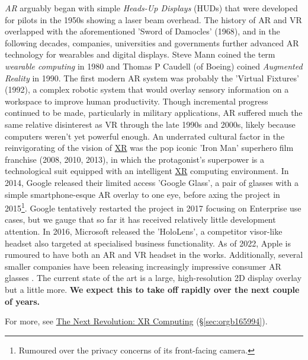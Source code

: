 \documentclass[logo,bsc,singlespacing,parskip]{infthesis}
\begin{document}
\emph{AR} arguably began with simple \emph{Heads-Up Displays} (HUDs) that were developed for pilots in the 1950s showing a laser beam overhead.
The history of AR and VR overlapped with the aforementioned 'Sword of Damocles' (1968), and in the following decades, companies, universities and governments further advanced AR technology for wearables and digital displays.
Steve Mann coined the term \emph{wearable computing} in 1980 and Thomas P Caudell (of Boeing) coined \emph{Augmented Reality} in 1990.
The first modern AR system was probably the 'Virtual Fixtures' (1992), a complex robotic system that would overlay sensory information on a workspace to improve human productivity.
Though incremental progress continued to be made, particularly in military applications, AR suffered much the same relative disinterest as VR through the late 1990s and 2000s, likely because computers weren't yet powerful enough.
An underrated cultural factor in the reinvigorating of the vision of \hyperref[org39cbd51]{XR} was the pop iconic 'Iron Man' superhero film franchise (2008, 2010, 2013),  in which the protagonist's superpower is a technological suit equipped with an intelligent \hyperref[org39cbd51]{XR} computing environment.
In 2014, Google released their limited access 'Google Glass', a pair of glasses with a simple smartphone-esque AR overlay to one eye, before axing the project in 2015\footnote{Rumoured over the privacy concerns of its front-facing camera.}.
Google tentatively restarted the project in 2017 focusing on Enterprise use cases, but we gauge that so far it has received relatively little development attention.
In 2016, Microsoft released the 'HoloLens', a competitor visor-like headset also targeted at specialised business functionality.
As of 2022, Apple is rumoured to have both an AR and VR headset in the works.
Additionally, several smaller companies have been releasing increasingly impressive consumer AR glasses \autocites{NrealAir}[][]{INMOAIRWorld}[][]{VuzixBladeUpgraded}.
The current state of the art is a large, high-resolution 2D display overlay but a little more.
\textbf{We expect this to take off rapidly over the next couple of years.}

For more, see \hyperref[sec:orgb165994]{The Next Revolution: XR Computing} (\S \ref{sec:orgb165994}).
\end{document}
